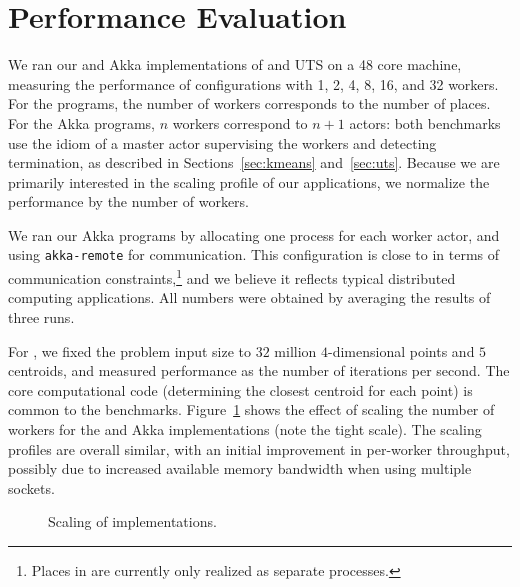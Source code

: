 \section{Performance Evaluation}
\label{sec:perf}
We ran our \apgas and Akka implementations of \kmeans and UTS on a 48 core
machine, measuring the performance of configurations with 1, 2, 4, 8, 16, and
32 workers. For the \apgas programs, the number of workers corresponds to the
number of places. For the Akka programs, $n$ workers correspond to $n+1$
actors: both benchmarks use the idiom of a master actor supervising the
workers and detecting termination, as described in Sections~\ref{sec:kmeans}
and~\ref{sec:uts}. Because we are primarily interested in the scaling profile of
our applications, we normalize the performance by the number of workers.

We ran our Akka programs by allocating one process for each worker actor, and
using \lstinline{akka-remote} for communication. This configuration is close to
\apgas in terms of communication constraints,\footnote{Places in \apgas are
currently only realized as separate processes.} and we believe it reflects
typical distributed computing applications. All numbers were obtained by
averaging the results of three runs.

For \kmeans, we fixed the problem input size to $32$ million $4$-dimensional
points and $5$ centroids, and measured performance as the number of iterations
per second. The core computational code (determining the closest centroid for
each point) is common to the benchmarks. Figure~\ref{fig:kmeans-scaling} shows
the effect of scaling the number of workers for the \apgas and Akka
implementations (note the tight scale). The scaling profiles are overall
similar, with an initial improvement in per-worker throughput, possibly due to
increased available memory bandwidth when using multiple sockets.

\begin{figure}
\hspace{-0.2cm}
\begingroup\graphicspath{{figures/}}\endgroup
\caption{Scaling of \kmeans implementations.}
\label{fig:kmeans-scaling}
\end{figure}

